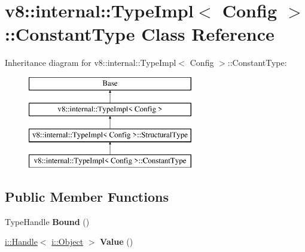 \hypertarget{classv8_1_1internal_1_1_type_impl_1_1_constant_type}{}\section{v8\+:\+:internal\+:\+:Type\+Impl$<$ Config $>$\+:\+:Constant\+Type Class Reference}
\label{classv8_1_1internal_1_1_type_impl_1_1_constant_type}
Inheritance diagram for v8\+:\+:internal\+:\+:Type\+Impl$<$ Config $>$\+:\+:Constant\+Type\+:\begin{figure}[H]
\begin{center}
\leavevmode
\includegraphics[height=4.000000cm]{classv8_1_1internal_1_1_type_impl_1_1_constant_type}
\end{center}
\end{figure}
\subsection*{Public Member Functions}
\begin{DoxyCompactItemize}
\item 
\hypertarget{classv8_1_1internal_1_1_type_impl_1_1_constant_type_aa4a82f272e18fa4c70ea45e845ceb011}{}Type\+Handle {\bfseries Bound} ()\label{classv8_1_1internal_1_1_type_impl_1_1_constant_type_aa4a82f272e18fa4c70ea45e845ceb011}

\item 
\hypertarget{classv8_1_1internal_1_1_type_impl_1_1_constant_type_a74deff5c404904952c7538578f2ecb3e}{}\hyperlink{classv8_1_1internal_1_1_handle}{i\+::\+Handle}$<$ \hyperlink{classv8_1_1internal_1_1_object}{i\+::\+Object} $>$ {\bfseries Value} ()\label{classv8_1_1internal_1_1_type_impl_1_1_constant_type_a74deff5c404904952c7538578f2ecb3e}

\end{DoxyCompactItemize}
